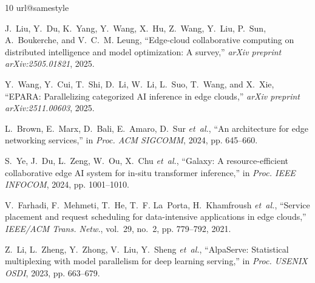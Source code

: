 \documentclass[journal]{IEEEtran}
\begin{document}
%   
%   
\begin{thebibliography}{10}
\providecommand{\url}[1]{#1}
\csname url@samestyle\endcsname
\providecommand{\newblock}{\relax}
\providecommand{\bibinfo}[2]{#2}
\providecommand{\BIBentrySTDinterwordspacing}{\spaceskip=0pt\relax}
\providecommand{\BIBentryALTinterwordstretchfactor}{4}
\providecommand{\BIBentryALTinterwordspacing}{\spaceskip=\fontdimen2\font plus
\BIBentryALTinterwordstretchfactor\fontdimen3\font minus
  \fontdimen4\font\relax}
\providecommand{\BIBforeignlanguage}[2]{{%
\expandafter\ifx\csname l@#1\endcsname\relax
\typeout{** WARNING: IEEEtran.bst: No hyphenation pattern has been}%
\typeout{** loaded for the language `#1'. Using the pattern for}%
\typeout{** the default language instead.}%
\else
\language=\csname l@#1\endcsname
\fi
#2}}
\providecommand{\BIBdecl}{\relax}
\BIBdecl

J.~Liu, Y.~Du, K.~Yang, Y.~Wang, X.~Hu, Z.~Wang, Y.~Liu, P.~Sun, A.~Boukerche,
  and V.~C.~M. Leung, ``Edge-cloud collaborative computing on distributed
  intelligence and model optimization: A survey,'' \emph{arXiv preprint
  arXiv:2505.01821}, 2025.

Y.~Wang, Y.~Cui, T.~Shi, D.~Li, W.~Li, L.~Suo, T.~Wang, and X.~Xie, ``{EPARA}:
  Parallelizing categorized {AI} inference in edge clouds,'' \emph{arXiv
  preprint arXiv:2511.00603}, 2025.

L.~Brown, E.~Marx, D.~Bali, E.~Amaro, D.~Sur \emph{et~al.}, ``An architecture
  for edge networking services,'' in \emph{Proc. ACM SIGCOMM}, 2024, pp.
  645--660.

S.~Ye, J.~Du, L.~Zeng, W.~Ou, X.~Chu \emph{et~al.}, ``Galaxy: A
  resource-efficient collaborative edge {AI} system for in-situ transformer
  inference,'' in \emph{Proc. IEEE INFOCOM}, 2024, pp. 1001--1010.

V.~Farhadi, F.~Mehmeti, T.~He, T.~F. La~Porta, H.~Khamfroush \emph{et~al.},
  ``Service placement and request scheduling for data-intensive applications in
  edge clouds,'' \emph{IEEE/ACM Trans. Netw.}, vol.~29, no.~2, pp. 779--792,
  2021.

Z.~Li, L.~Zheng, Y.~Zhong, V.~Liu, Y.~Sheng \emph{et~al.}, ``{AlpaServe}:
  Statistical multiplexing with model parallelism for deep learning serving,''
  in \emph{Proc. USENIX OSDI}, 2023, pp. 663--679.


\end{thebibliography}
\end{document}
